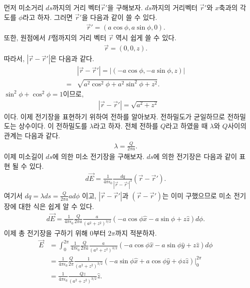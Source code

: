 \documentclass[tightenlines,floatfix,nofootinbib,superscriptaddress,fleqn]{revtex4}
\begin{document}
먼저 미소거리 $ds$까지의 거리 벡터$\vec{r}'$을 구해보자.
$ds$까지의 거리벡터 $\vec{r}'$와 $x$축과의 각도를 $\phi$라고 하자.
그러면 $\vec{r}'$을 다음과 같이 쓸 수 있다.
\begin{align}
  \vec{r}'=\left(a\cos{\phi},a\sin{\phi},0\right).
\end{align}
  또한, 원점에서 $P$점까지의 거리 벡터 $\vec{r}$ 역시 쉽게 쓸 수 있다.
\begin{align}
  \vec{r}=\left(0,0,z\right).
\end{align}
따라서, $\left|\vec{r}-\vec{r}'\right|$은 다음과 같다.
\begin{align}
  &\left|\vec{r}-\vec{r}'\right|=\left|\left(-a\cos{\phi},-a\sin{\phi},z\right)\right|\\
  =&\sqrt{a^2\cos^2{\phi}+a^2\sin^2{\phi}+z^2}.
\end{align}
$\sin^2{\phi}+\cos^2{\phi}=1$이므로,
\begin{align}
  &\left|\vec{r}-\vec{r}'\right|=\sqrt{a^2+z^2}
\end{align}
이다. 이제 전기장을 표현하기 위하여 전하를 알아보자.
전하밀도가 균일하므로 전하밀도는 상수이다. 이 전하밀도를 $\lambda$라고 하자.
전체 전하를 $Q$라고 하였을 때 $\lambda$와 $Q$사이의 관계는 다음과 같다.
\begin{align}
  \lambda=\frac{Q}{2\pi a}.
\end{align}
이제 미소길이 $ds$에 의한 미소 전기장을 구해보자. $ds$에 의한 전기장은 다음과 같이 표현 될 수 있다.
\begin{align}
  d\vec{E}=\frac{1}{4\pi \epsilon_0}\frac{dq}{\left|\vec{r}-\vec{r}'\right|^3}\left(\vec{r}-\vec{r}'\right).
\end{align}
여기서 $dq=\lambda ds=\frac{Q}{2\pi a} a d\phi$ 이고, $\left|\vec{r}-\vec{r}'\right|$과 $\left(\vec{r}-\vec{r}'\right)$는 이미 구했으므로
미소 전기장에 대한 식은 쉽게 알 수 있다.
\begin{align}
  d\vec{E}=\frac{1}{4\pi \epsilon_0}\frac{Q}{2\pi a}\frac{a}{\left(a^2+z^2\right)^{3/2}}\left(-a\cos{\phi}\hat{x}-a\sin{\phi}+z\hat{z}\right)d \phi.
\end{align}
이제 총 전기장을 구하기 위해 $0$부터 $2\pi$까지 적분하자.
\begin{align}
  \vec{E}&=\int^{2\pi}_{0}\frac{1}{4\pi \epsilon_0}\frac{Q}{2\pi a}\frac{a}{\left(a^2+z^2\right)^{3/2}}\left(-a\cos{\phi}\hat{x}-a\sin{\phi}\hat{y}+z\hat{z}\right)d\phi\\
  &=\frac{1}{4\pi \epsilon_0}\frac{Q}{2\pi}\frac{1}{\left(a^2+z^2\right)^{3/2}}\left(-a\sin{\phi}\hat{x}+a\cos{\phi}\hat{y}+\phi z\hat{z}\right)|^{2\pi}_0 \\
  &=\frac{1}{4 \pi \epsilon_0}\frac{Qz}{\left(a^2+z^2\right)^{3/2}}\hat{z}.
\end{align}
\end{document}
